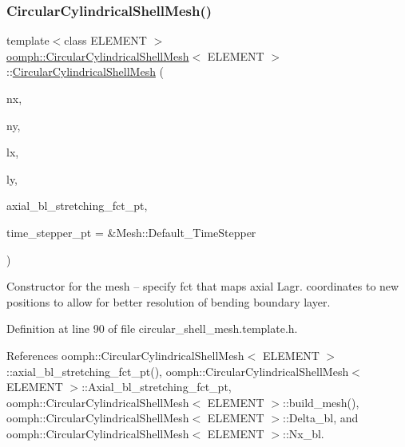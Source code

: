 \subsubsection{\texorpdfstring{Circular\+Cylindrical\+Shell\+Mesh()}{CircularCylindricalShellMesh()}\hspace{0.1cm}{\footnotesize\ttfamily [2/3]}}
{\footnotesize\ttfamily template$<$class E\+L\+E\+M\+E\+NT $>$ \\
\hyperlink{classoomph_1_1CircularCylindricalShellMesh}{oomph\+::\+Circular\+Cylindrical\+Shell\+Mesh}$<$ E\+L\+E\+M\+E\+NT $>$\+::\hyperlink{classoomph_1_1CircularCylindricalShellMesh}{Circular\+Cylindrical\+Shell\+Mesh} (\begin{DoxyParamCaption}\item[{const unsigned \&}]{nx,  }\item[{const unsigned \&}]{ny,  }\item[{const double \&}]{lx,  }\item[{const double \&}]{ly,  }\item[{\hyperlink{classoomph_1_1CircularCylindricalShellMesh_a770336fa72e8911f31b9fe3f70197a51}{Axial\+B\+L\+Stretching\+Fct\+Pt}}]{axial\+\_\+bl\+\_\+stretching\+\_\+fct\+\_\+pt,  }\item[{Time\+Stepper $\ast$}]{time\+\_\+stepper\+\_\+pt = {\ttfamily \&Mesh\+:\+:Default\+\_\+TimeStepper} }\end{DoxyParamCaption})\hspace{0.3cm}{\ttfamily [inline]}}



Constructor for the mesh -- specify fct that maps axial Lagr. coordinates to new positions to allow for better resolution of bending boundary layer. 



Definition at line 90 of file circular\+\_\+shell\+\_\+mesh.\+template.\+h.



References oomph\+::\+Circular\+Cylindrical\+Shell\+Mesh$<$ E\+L\+E\+M\+E\+N\+T $>$\+::axial\+\_\+bl\+\_\+stretching\+\_\+fct\+\_\+pt(), oomph\+::\+Circular\+Cylindrical\+Shell\+Mesh$<$ E\+L\+E\+M\+E\+N\+T $>$\+::\+Axial\+\_\+bl\+\_\+stretching\+\_\+fct\+\_\+pt, oomph\+::\+Circular\+Cylindrical\+Shell\+Mesh$<$ E\+L\+E\+M\+E\+N\+T $>$\+::build\+\_\+mesh(), oomph\+::\+Circular\+Cylindrical\+Shell\+Mesh$<$ E\+L\+E\+M\+E\+N\+T $>$\+::\+Delta\+\_\+bl, and oomph\+::\+Circular\+Cylindrical\+Shell\+Mesh$<$ E\+L\+E\+M\+E\+N\+T $>$\+::\+Nx\+\_\+bl.

\mbox{\label{classoomph_1_1CircularCylindricalShellMesh_aba83d68289f90a8567887443c3b9c6f0}} 

